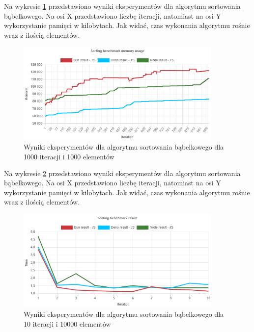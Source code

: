 Na wykresie \ref{fig:bubble_sorting_e3_memory_ts} przedstawiono wyniki eksperymentów dla algorytmu sortowania bąbelkowego. Na osi X przedstawiono liczbę iteracji, natomiast na osi Y wykorzystanie pamięci w kilobytach. Jak widać, czas wykonania algorytmu rośnie wraz z ilością elementów.
\begin{figure}[H]
  \centering
  \includegraphics[width=0.9\textwidth]{Figures/sorting/bubble/e3_memory_ts.png}
  \caption{Wyniki eksperymentów dla algorytmu sortowania bąbelkowego dla 1000 iteracji i 1000 elementów}
  \label{fig:bubble_sorting_e3_memory_ts}
\end{figure}

Na wykresie \ref{fig:bubble_sorting_e4} przedstawiono wyniki eksperymentów dla algorytmu sortowania bąbelkowego. Na osi X przedstawiono liczbę iteracji, natomiast na osi Y wykorzystanie pamięci w kilobytach. Jak widać, czas wykonania algorytmu rośnie wraz z ilością elementów.
\begin{figure}[H]
  \centering
  \includegraphics[width=0.9\textwidth]{Figures/sorting/bubble/e4_js.png}
  \caption{Wyniki eksperymentów dla algorytmu sortowania bąbelkowego dla 10 iteracji i 10000 elementów}
  \label{fig:bubble_sorting_e4}
\end{figure}

